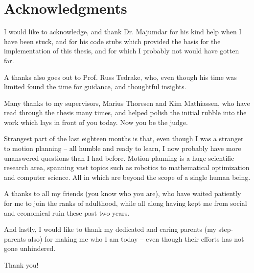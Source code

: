 \chapter{Acknowledgments}

I would like to acknowledge, and thank Dr. Majumdar for his kind help when I
have been stuck, and for his code stubs which provided the basis for the
implementation of this thesis, and for which I probably not would have gotten
far.

A thanks also goes out to Prof. Russ Tedrake, who, even though his time was
limited found the time for guidance, and thoughtful insights.

Many thanks to my supervisors, Marius Thoresen and Kim Mathiassen, who have read
through the thesis many times, and helped polish the initial rubble into the
work which lays in front of you today. Now you be the judge.

Strangest part of the last eighteen months is that, even though I was a stranger
to motion planning -- all humble and ready to learn, I now probably have more
unanswered questions than I had before. Motion planning is a huge scientific
research area, spanning vast topics such as robotics to mathematical optimization
and computer science. All in which are beyond the scope of a single human being.

A thanks to all my friends (you know who you are), who have waited patiently for
me to join the ranks of adulthood, while all along having kept me from social
and economical ruin these past two years.

And lastly, I would like to thank my dedicated and caring parents (my
step-parents also) for making me who I am today -- even though their efforts has
not gone unhindered.

Thank you!
